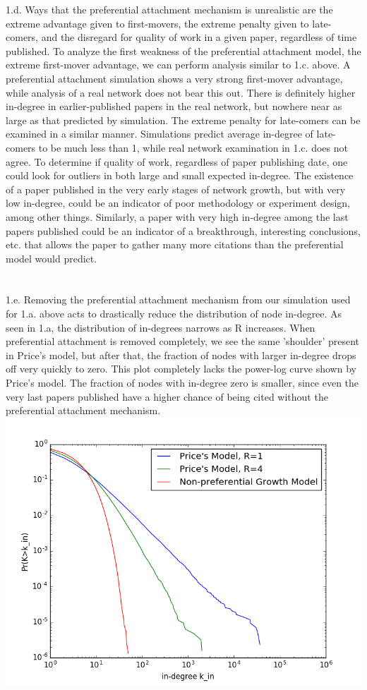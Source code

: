 \documentclass[11pt, oneside]{article}   	%
\begin{document}
 1.d.  Ways that the preferential attachment mechanism is unrealistic are the extreme advantage given to first-movers, the extreme penalty given to late-comers, and the disregard for quality of work in a given paper, regardless of time published.  To analyze the first weakness of the preferential attachment model, the extreme first-mover advantage, we can perform analysis similar to 1.c. above.  A preferential attachment simulation shows a very strong first-mover advantage, while analysis of a real network does not bear this out.  There is definitely higher in-degree in earlier-published papers in the real network, but nowhere near as large as that predicted by simulation.  The extreme penalty for late-comers can be examined in a similar manner.  Simulations predict average in-degree of late-comers to be much less than 1, while real network examination in 1.c. does not agree.  To determine if quality of work, regardless of paper publishing date, one could look for outliers in both large and small expected in-degree.  The existence of a paper published in the very early stages of network growth, but with very low in-degree, could be an indicator of poor methodology or experiment design, among other things.  Similarly, a paper with very high in-degree among the last papers published could be an indicator of a breakthrough, interesting conclusions, etc. that allows the paper to gather many more citations than the preferential model would predict.\\\\\\
 1.e.  Removing the preferential attachment mechanism from our simulation used for 1.a. above acts to drastically reduce the distribution of node in-degree.  As seen in 1.a, the distribution of in-degrees narrows as R increases.  When preferential attachment is removed completely, we see the same 'shoulder' present in Price's model, but after that, the fraction of nodes with larger in-degree drops off very quickly to zero.  This plot completely lacks the power-log curve shown by Price's model.  The fraction of nodes with in-degree zero is smaller, since even the very last papers published have a higher chance of being cited without the preferential attachment mechanism.\\
 \includegraphics[scale=0.5]{1e}
\end{document}
